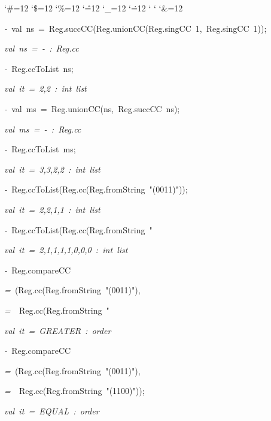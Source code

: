\begin{list}{}
{\setlength{\leftmargin}{\leftmargini}
\setlength{\rightmargin}{0cm}
\setlength{\itemindent}{0cm}
\setlength{\listparindent}{0cm}
\setlength{\itemsep}{0cm}
\setlength{\parsep}{0cm}
\setlength{\labelsep}{0cm}
\setlength{\labelwidth}{0cm}
\catcode`\#=12
\catcode`\$=12
\catcode`\%=12
\catcode`\^=12
\catcode`\_=12
\catcode`\.=12
\catcode`
\catcode`
\catcode`\&=12
\ttfamily}
\small
\item[]\textsl{-\ }val\ ns\ =\ Reg.succCC(Reg.unionCC(Reg.singCC\ 1,\ Reg.singCC\ 1));
\item[]\textsl{val\ ns\ =\ -\ :\ Reg.cc}
\item[]\textsl{-\ }Reg.ccToList\ ns;
\item[]\textsl{val\ it\ =\ 2,2\ :\ int\ list}
\item[]\textsl{-\ }val\ ms\ =\ Reg.unionCC(ns,\ Reg.succCC\ ns);
\item[]\textsl{val\ ms\ =\ -\ :\ Reg.cc}
\item[]\textsl{-\ }Reg.ccToList\ ms;
\item[]\textsl{val\ it\ =\ 3,3,2,2\ :\ int\ list}
\item[]\textsl{-\ }Reg.ccToList(Reg.cc(Reg.fromString\ "(0011)"));
\item[]\textsl{val\ it\ =\ 2,2,1,1\ :\ int\ list}
\item[]\textsl{-\ }Reg.ccToList(Reg.cc(Reg.fromString\ "%
\item[]\textsl{val\ it\ =\ 2,1,1,1,1,0,0,0\ :\ int\ list}
\item[]\textsl{-\ }Reg.compareCC
\item[]\textsl{=\ }(Reg.cc(Reg.fromString\ "(0011)"),
\item[]\textsl{=\ }\ Reg.cc(Reg.fromString\ "%
\item[]\textsl{val\ it\ =\ GREATER\ :\ order}
\item[]\textsl{-\ }Reg.compareCC
\item[]\textsl{=\ }(Reg.cc(Reg.fromString\ "(0011)"),
\item[]\textsl{=\ }\ Reg.cc(Reg.fromString\ "(1100)"));
\item[]\textsl{val\ it\ =\ EQUAL\ :\ order}
\end{list}
